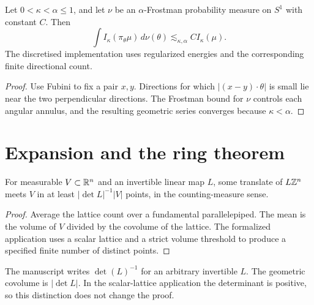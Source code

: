 \begin{theorem}
\label{thm:kaufman-energy}
Let $0<\kappa<\alpha\leq1$, and let $\nu$ be an
$\alpha$-Frostman probability measure on $S^1$ with constant $C$.
Then
\[
 \int I_\kappa(\pi_\theta\mu)\,d\nu(\theta)
                         \lesssim_{\kappa,\alpha}C I_\kappa(\mu).
\]
The discretised implementation uses regularized energies and the
corresponding finite directional count.
\end{theorem}
\begin{proof}
Use Fubini to fix a pair $x,y$. Directions for which
$|(x-y)\cdot\theta|$ is small lie near the two perpendicular
directions. The Frostman bound for $\nu$ controls each angular
annulus, and the resulting geometric series converges because
$\kappa<\alpha$.
\end{proof}

\section{Expansion and the ring theorem}

\begin{lemma}
\label{lem:lattice-translate}
For measurable $V\subset\mathbb{R}^n$ and an invertible linear map $L$,
some translate of $L\mathbb{Z}^n$ meets $V$ in at least
$|\det L|^{-1}|V|$ points, in the counting-measure sense.
\end{lemma}
\begin{proof}
Average the lattice count over a fundamental parallelepiped.
The mean is the volume of $V$ divided by the covolume of the lattice.
The formalized application uses a scalar lattice and a strict
volume threshold to produce a specified finite number of distinct
points.
\end{proof}

\begin{remark}
\label{rem:lattice-determinant}
The manuscript writes $\det(L)^{-1}$ for an arbitrary invertible
$L$. The geometric covolume is $|\det L|$. In the scalar-lattice
application the determinant is positive, so this distinction does
not change the proof.
\end{remark}


